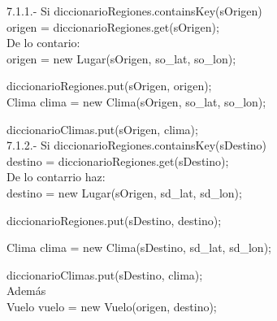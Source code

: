 \documentclass[30pt]{article}
\theoremstyle{definition}
\begin{document}
    \hspace{4cm} 7.1.1.- Si diccionarioRegiones.containsKey(sOrigen)\\
    
    \hspace{4cm} origen = diccionarioRegiones.get(sOrigen);\\
    
    \hspace{5cm} De lo contario:\\
    
    \hspace{5cm} origen = new Lugar(sOrigen, so\_lat, so\_lon);
                
  \hspace{5cm} diccionarioRegiones.put(sOrigen, origen);\\

  \hspace{5cm} Clima clima = new Clima(sOrigen, so\_lat, so\_lon);
        
  \hspace{5cm} diccionarioClimas.put(sOrigen, clima);\\
  
    \hspace{4cm} 7.1.2.- Si diccionarioRegiones.containsKey(sDestino)\\
    
    \hspace{5cm} destino = diccionarioRegiones.get(sDestino);\\
    
    \hspace{5cm} De lo contarrio haz:\\
    
    \hspace{5cm} destino = new Lugar(sOrigen, sd\_lat, sd\_lon);
                
  \hspace{5cm} diccionarioRegiones.put(sDestino, destino);

  \hspace{5cm} Clima clima = new Clima(sDestino, sd\_lat, sd\_lon);
        
  \hspace{5cm} diccionarioClimas.put(sDestino, clima);\\
    
    \hspace{3cm} Además\\
    
    \hspace{3cm} Vuelo vuelo = new Vuelo(origen, destino);
    
\end{document}
